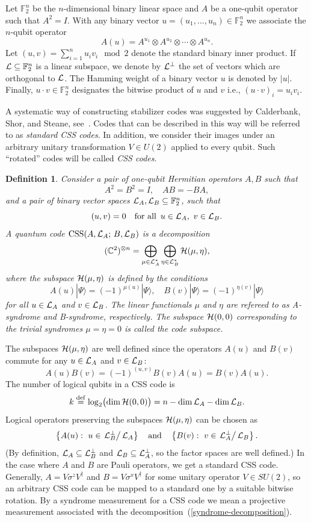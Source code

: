 \documentclass[pra,twocolumn,showpacs]{revtex4}
\newtheorem{dfn}{Definition}
\newcommand{\CC}{\mathbb{C}}
\newcommand{\FF}{\mathbb{F}}
\newcommand{\calL}{{\cal L }}
\newcommand{\calH}{{\cal H }}
\newcommand{\ra}{\rangle}
\newcommand{\bydef}{\stackrel{\mathrm{def}}{=}}
\newcommand{\sx}{\sigma^x}
\newcommand{\sz}{\sigma^z}
\DeclareMathOperator*{\CSS}{\mathop{\mathrm{CSS}}}
\begin{document}
Let $\FF_2^n$ be the $n$-dimensional binary linear space and $A$ be a one-qubit
operator such that $A^{2}=I$. With any binary vector
$u=(u_1,\ldots,u_n)\in\FF_2^n$ we associate the $n$-qubit operator
\[
A(u)=A^{u_1}\otimes A^{u_2}\otimes \cdots\otimes A^{u_n}.
\]
Let $(u,v)=\sum_{i=1}^n u_i v_i \mod{2}$ denote the standard binary inner
product. If $\calL\subseteq \FF_2^n$ is a linear subspace, we denote by
$\calL^\perp$ the set of vectors which are orthogonal to $\calL$. The Hamming
weight of a binary vector $u$ is denoted by $|u|$.  Finally, $u\cdot v \in
\FF_2^n$ designates the bitwise product of $u$ and $v$ i.e.,  $(u\cdot v)_i
=u_i v_i$.

A systematic way of constructing stabilizer codes was suggested by Calderbank,
Shor, and Steane, see~\cite{CSS96,CSS96'}. Codes that can be described in this
way will be referred to as \emph{standard CSS codes}. In addition, we consider
their images under an arbitrary unitary transformation $V\in U(2)$ applied to
every qubit. Such ``rotated'' codes will be called \emph{CSS codes}.
\begin{dfn}
Consider a pair of one-qubit Hermitian operators
$A, B$ such that
\[
A^2=B^2=I, \quad AB=-BA,
\]
and a pair of binary vector spaces
$\calL_A, \calL_B \subseteq \FF_2^n$, such that
\[
(u,v)=0 \quad \text{for all}\,\ u\in \calL_A,\ v\in \calL_B.
\]
A quantum code $\CSS(A,\calL_A;\,B,\calL_B)$ is a decomposition
\begin{equation}\label{syndrome-decomposition}
(\CC^2)^{\otimes n}=\bigoplus_{\mu\in \calL_A^*}
\bigoplus_{\eta\in \calL_B^*}
\calH(\mu,\eta),
\end{equation}
where the subspace $\calH(\mu,\eta)$ is defined by the conditions
\[
A(u)|\Psi\ra=(-1)^{\mu(u)}|\Psi\ra,\quad
B(v)|\Psi\ra=(-1)^{\eta(v)}|\Psi\ra
\]
for all $u\in \calL_A$ and $v\in \calL_B$. 
The linear functionals $\mu$ and $\eta$ are refereed to as
A-syndrome and B-syndrome, respectively. The subspace $\calH(0,0)$
corresponding to the trivial syndromes $\mu=\eta=0$
is called the code subspace.
\end{dfn}
The subspaces $\calH(\mu,\eta)$ are well defined since 
the operators $A(u)$ and $B(v)$ commute for any $u\in \calL_A$
and $v \in \calL_B$:
\[
A(u)B(v)=(-1)^{(u,v)}B(v)A(u)=B(v)A(u).
\]
The number of logical qubits in a CSS code is
\[
k\bydef\log_2\bigl(\dim{\calH(0,0)}\bigr)=n-\dim{\calL_A} - \dim{\calL_B}.
\]
Logical operators preserving the subspaces $\calH(\mu,\eta)$ can be
chosen as
\[
\left\{ A(u):\ u\in \left.\calL_B^\perp\right/ \calL_A \right\} 
\quad \text{and} \quad
\left\{ B(v):\ v\in \left.\calL_A^\perp\right/ \calL_B \right\}.
\]
(By definition, $\calL_A\subseteq \calL_B^\perp$ and $\calL_B\subseteq
\calL_A^\perp$, so the factor spaces are well defined.)  In the case where $A$
and $B$ are Pauli operators, we get a standard CSS code. Generally, $A=V\sz
V^\dag$ and $B=V\sx V^\dag$ for some unitary operator $V\in SU(2)$, so an
arbitrary CSS code can be mapped to a standard one by a suitable bitwise
rotation. By a syndrome measurement for a CSS code we mean a projective
measurement associated with the decomposition~(\ref{syndrome-decomposition}).
\end{document}
